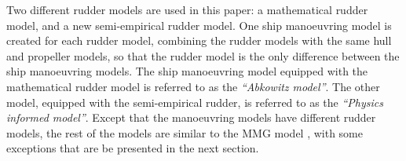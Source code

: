Two different rudder models are used in this paper: a mathematical rudder model, and a new semi-empirical rudder model.
One ship manoeuvring model is created for each rudder model, combining the rudder models with the same hull and propeller models, so that the rudder model is the only difference between the ship manoeuvring models.
The ship manoeuvring model equipped with the mathematical rudder model is referred to as the \emph{``Abkowitz model''}. The other model, equipped with the semi-empirical rudder, is referred to as the \emph{``Physics informed model''}. Except that the manoeuvring models have different rudder models, the rest of the models are similar to the MMG model \citep{yasukawa_introduction_2015}, with some exceptions that are be presented in the next section.